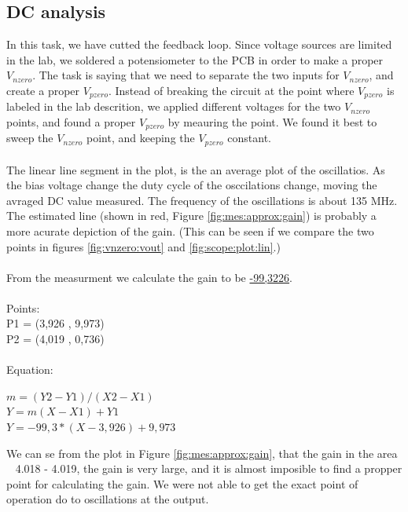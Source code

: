 \documentclass[a4paper,english,11pt]{article}
\begin{document}
\subsection*{DC analysis}
In this task, we have cutted the feedback loop. Since voltage sources are limited in the lab, we soldered a potensiometer to the PCB
in order to make a proper $V_{nzero}$. The task is saying that we need to separate the two inputs for $V_{nzero}$, and create a proper $V_{pzero}$.
Instead of breaking the circuit at the point where $V_{pzero}$ is labeled in the lab descrition, we applied different voltages for the two 
$V_{nzero}$ points, and found a proper $V_{pzero}$ by meauring the point. We found it best to sweep the $V_{nzero}$ point, and keeping the $V_{pzero}$ constant.
\\
\\
The linear line segment in the plot, is the an average plot of the oscillatios. As the bias voltage change the duty cycle of the osccilations change, moving the 
avraged DC value measured. The frequency of the oscillations is about 135 MHz. 
The estimated line (shown in red, Figure \ref{fig:mes:approx:gain}) is probably a more acurate depiction of the gain.
(This can be seen if we compare the two points in figures \ref{fig:vnzero:vout} and \ref{fig:scope:plot:lin}.)\\
\\
From the measurment we calculate the gain to be \underline{-99,3226}.\\
\\
Points:\\
P1 = (3,926 , 9,973)\\
P2 = (4,019 , 0,736)\\
\\
Equation:
\begin{center}
$m = (Y2 - Y1) / (X2 - X1)$\\
$Y = m(X - X1) + Y1$\\
$Y = -99,3 * (X - 3,926) + 9,973$
\end{center}
We can se from the plot in Figure \ref{fig:mes:approx:gain}, that the gain in the area ~ 4.018 - 4.019, the gain is very large, and it is almost imposible to find a propper
point for calculating the gain. We were not able to get the exact point of operation do to oscillations at the output. 
\end{document}
